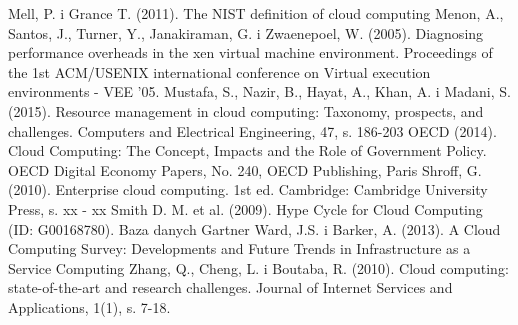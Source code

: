 \documentclass[12pt,a4paper,twoside]{article}
\begin{document}
\begin{thebibliography}{99}
 Mell, P. i Grance T. (2011). The NIST definition of cloud computing
 Menon, A., Santos, J., Turner, Y., Janakiraman, G. i Zwaenepoel, W. (2005). Diagnosing performance overheads in the xen virtual machine environment. Proceedings of the 1st ACM/USENIX international conference on Virtual execution environments - VEE '05.
 Mustafa, S., Nazir, B., Hayat, A., Khan, A. i Madani, S. (2015). Resource management in cloud computing: Taxonomy, prospects, and challenges. Computers and Electrical Engineering, 47, s. 186-203
 OECD (2014). Cloud Computing: The Concept, Impacts and the Role of Government Policy. OECD Digital Economy Papers, No. 240, OECD Publishing, Paris
 Shroff, G. (2010). Enterprise cloud computing. 1st ed. Cambridge: Cambridge University Press, s. xx - xx
 Smith D. M. et al. (2009). Hype Cycle for Cloud Computing (ID: G00168780). Baza danych Gartner
 Ward, J.S. i Barker, A. (2013). A Cloud Computing Survey: Developments and Future Trends in Infrastructure as a Service Computing
 Zhang, Q., Cheng, L. i Boutaba, R. (2010). Cloud computing: state-of-the-art and research challenges. Journal of Internet Services and Applications, 1(1), s. 7-18.

\end{thebibliography}
\clearpage

\listoffigures

\clearpage

\listoftables

\clearpage
\end{document}
